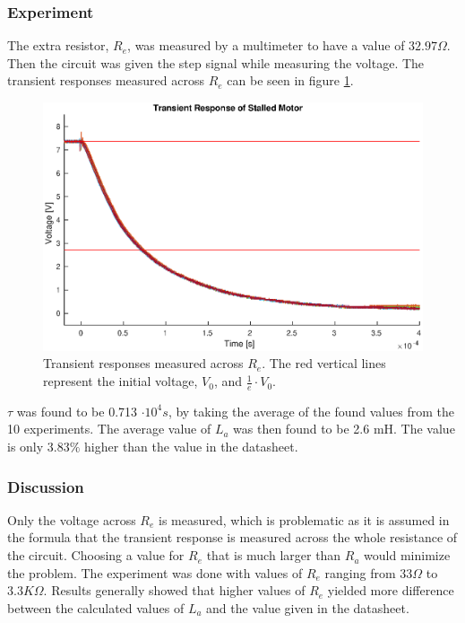 \subsubsection{Experiment}
The extra resistor, $R_e$, was measured by a multimeter to have a value of $32.97\Omega$.
Then the circuit was given the step signal while measuring the voltage.
The transient responses measured across $R_e$ can be seen in figure \ref{fig:trans_plot}.

\begin{figure}[!h]
	\centering
	\includegraphics[width=\linewidth]{graphics/transient_32ohm}
	\caption{Transient responses measured across $R_e$. The red vertical lines represent the initial voltage, $V_0$, and $\frac{1}{e} \cdot V_0$.}
	\label{fig:trans_plot}
\end{figure}


$\tau$ was found to be 0.713 $\cdot 10^4 s$, by taking the average of the found values from the 10 experiments.
The average value of $L_a$ was then found to be 2.6 mH. The value is only $3.83\%$ higher than the value in the datasheet.

\subsubsection{Discussion}
Only the voltage across $R_e$ is measured, which is problematic as it is assumed in the formula that the transient response is measured across the whole resistance of the circuit. Choosing a value for $R_e$ that is much larger than $R_a$ would minimize the problem.
The experiment was done with values of $R_e$ ranging from $33\Omega$ to $3.3K\Omega$.
Results generally showed that higher values of $R_e$ yielded more difference between the calculated values of $L_a$ and the value given in the datasheet.